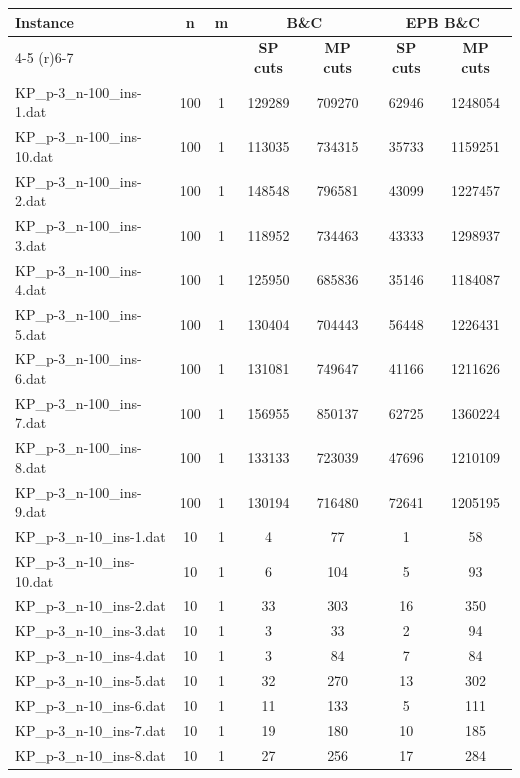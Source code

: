 \begin{table}[!ht]
\centering
\hspace*{-1cm}\begin{tabular}{lcccccc}
\toprule
\textbf{Instance} & \textbf{n} & \textbf{m} & \multicolumn{2}{c}{\textbf{B\&C}}  & \multicolumn{2}{c}{\textbf{EPB B\&C}}
\\
\cmidrule(r){4-5} \cmidrule(r){6-7} 
~ & ~ & ~ & \textbf{SP cuts} &\textbf{MP cuts} & \textbf{SP cuts} &\textbf{MP cuts} \\
\midrule

KP\_p-3\_n-100\_ins-1.dat & 100 & 1 & 129289 & 709270 & 62946 & 1248054 \\
KP\_p-3\_n-100\_ins-10.dat & 100 & 1 & 113035 & 734315 & 35733 & 1159251 \\
KP\_p-3\_n-100\_ins-2.dat & 100 & 1 & 148548 & 796581 & 43099 & 1227457 \\
KP\_p-3\_n-100\_ins-3.dat & 100 & 1 & 118952 & 734463 & 43333 & 1298937 \\
KP\_p-3\_n-100\_ins-4.dat & 100 & 1 & 125950 & 685836 & 35146 & 1184087 \\
KP\_p-3\_n-100\_ins-5.dat & 100 & 1 & 130404 & 704443 & 56448 & 1226431 \\
KP\_p-3\_n-100\_ins-6.dat & 100 & 1 & 131081 & 749647 & 41166 & 1211626 \\
KP\_p-3\_n-100\_ins-7.dat & 100 & 1 & 156955 & 850137 & 62725 & 1360224 \\
KP\_p-3\_n-100\_ins-8.dat & 100 & 1 & 133133 & 723039 & 47696 & 1210109 \\
KP\_p-3\_n-100\_ins-9.dat & 100 & 1 & 130194 & 716480 & 72641 & 1205195 \\
KP\_p-3\_n-10\_ins-1.dat & 10 & 1 & 4 & 77 & 1 & 58 \\
KP\_p-3\_n-10\_ins-10.dat & 10 & 1 & 6 & 104 & 5 & 93 \\
KP\_p-3\_n-10\_ins-2.dat & 10 & 1 & 33 & 303 & 16 & 350 \\
KP\_p-3\_n-10\_ins-3.dat & 10 & 1 & 3 & 33 & 2 & 94 \\
KP\_p-3\_n-10\_ins-4.dat & 10 & 1 & 3 & 84 & 7 & 84 \\
KP\_p-3\_n-10\_ins-5.dat & 10 & 1 & 32 & 270 & 13 & 302 \\
KP\_p-3\_n-10\_ins-6.dat & 10 & 1 & 11 & 133 & 5 & 111 \\
KP\_p-3\_n-10\_ins-7.dat & 10 & 1 & 19 & 180 & 10 & 185 \\
KP\_p-3\_n-10\_ins-8.dat & 10 & 1 & 27 & 256 & 17 & 284 \\

\end{tabular}
\end{table}
